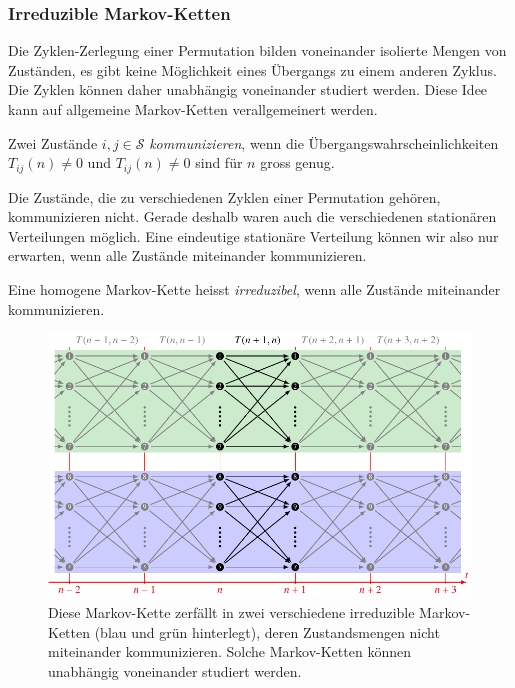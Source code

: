 \subsubsection{Irreduzible Markov-Ketten}
Die Zyklen-Zerlegung einer Permutation bilden voneinander isolierte
Mengen von Zuständen, es gibt keine Möglichkeit eines Übergangs zu
einem anderen Zyklus.
Die Zyklen können daher unabhängig voneinander studiert werden.
Diese Idee kann auf allgemeine Markov-Ketten verallgemeinert werden.

\begin{definition}
Zwei Zustände $i,j\in\mathcal{S}$ {\em kommunizieren}, wenn die
%
Übergangswahrscheinlichkeiten $T_{i\!j}(n) \ne 0$ und $T_{i\!j}(n)\ne 0$ sind
für $n$ gross genug.
\end{definition}

Die Zustände, die zu verschiedenen Zyklen einer Permutation gehören,
kommunizieren nicht.
Gerade deshalb waren auch die verschiedenen stationären Verteilungen
möglich.
Eine eindeutige stationäre Verteilung können wir also nur erwarten,
wenn alle Zustände miteinander kommunizieren.

\begin{definition}
Eine homogene Markov-Kette heisst {\em irreduzibel},
wenn alle Zustände miteinander kommunizieren.
\end{definition}

\begin{figure}
\centering
\includegraphics{chapters/80-wahrscheinlichkeit/images/markov2.pdf}
\caption{Diese Markov-Kette zerfällt in zwei verschiedene irreduzible
Markov-Ketten (blau und grün hinterlegt),
deren Zustandsmengen nicht miteinander kommunizieren.
Solche Markov-Ketten können unabhängig voneinander studiert werden.
\label{buch:wahrscheinlichkeit:fig:markovzerfall}}
\end{figure}

